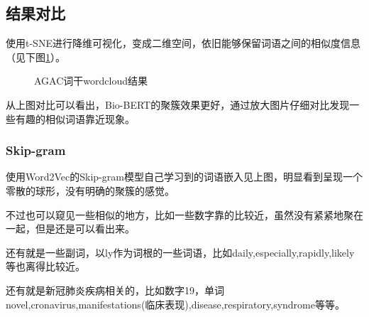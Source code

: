 \documentclass[12pt]{article}
\begin{document}
\subsection{结果对比}
使用t-SNE进行降维可视化，变成二维空间，依旧能够保留词语之间的相似度信息（见下图\ref{sda}）。
\begin{figure}[H]
  \centering
  \caption{AGAC词干wordcloud结果}
  \label{sda}
\end{figure}
从上图对比可以看出，Bio-BERT的聚簇效果更好，通过放大图片仔细对比发现一些有趣的相似词语靠近现象。\par
\subsubsection{Skip-gram}
使用Word2Vec的Skip-gram模型自己学习到的词语嵌入见上图，明显看到呈现一个零散的球形，没有明确的聚簇的感觉。\par
不过也可以窥见一些相似的地方，比如一些数字靠的比较近，虽然没有紧紧地聚在一起，但是还是可以看出来。\par
还有就是一些副词，以ly作为词根的一些词语，比如daily,especially,rapidly,likely等也离得比较近。\par
还有就是新冠肺炎疾病相关的，比如数字19，单词novel,cronavirus,manifestations(临床表现),disease,respiratory,syndrome等等。
\end{document}
